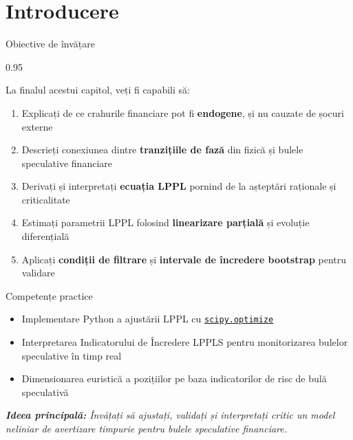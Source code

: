 \documentclass[9pt, aspectratio=169, t]{beamer}
\subtitle{Capitolul 13: Modele Log-Periodice de Tip Lege de Putere (LPPL)}
\begin{document}
{
\begin{frame}
    \titlepage
\end{frame}
}

\section{Introducere}

\begin{frame}{Obiective de învățare}
    \begin{cminipage}{0.95\textwidth}
    {\footnotesize
    \begin{block}{La finalul acestui capitol, veți fi capabili să:}
        \begin{enumerate}\setlength{\itemsep}{2pt}
            \item Explicați de ce crahurile financiare pot fi \textbf{endogene}, și nu cauzate de șocuri externe
            \item Descrieți conexiunea dintre \textbf{tranzițiile de fază} din fizică și bulele speculative financiare
            \item Derivați și interpretați \textbf{ecuația LPPL} pornind de la așteptări raționale și criticalitate
            \item Estimați parametrii LPPL folosind \textbf{linearizare parțială} și evoluție diferențială
            \item Aplicați \textbf{condiții de filtrare} și \textbf{intervale de încredere bootstrap} pentru validare
        \end{enumerate}
    \end{block}
    \vspace{0.1cm}
    \begin{alertblock}{Competențe practice}
        \begin{itemize}\setlength{\itemsep}{0pt}
            \item Implementare Python a ajustării LPPL cu \href{https://docs.scipy.org/doc/scipy/reference/optimize.html}{\texttt{scipy.optimize}}
            \item Interpretarea Indicatorului de Încredere LPPLS pentru monitorizarea bulelor speculative în timp real
            \item Dimensionarea euristică a pozițiilor pe baza indicatorilor de risc de bulă speculativă
        \end{itemize}
    \end{alertblock}
    \vspace{0.2cm}
    \textit{\textbf{Ideea principală:} Învățați să ajustați, validați și interpretați critic un model neliniar de avertizare timpurie pentru bulele speculative financiare.}
    }
    \end{cminipage}
\end{frame}
\end{document}

